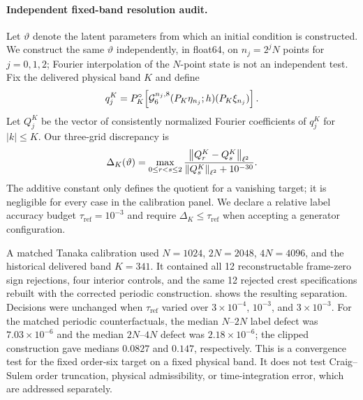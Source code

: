 \paragraph{Independent fixed-band resolution audit.}
Let $\vartheta$ denote the latent parameters from which an initial condition is
constructed.  We construct the same $\vartheta$ independently, in float64, on
$n_j=2^j N$ points for $j=0,1,2$; Fourier interpolation of the $N$-point state is
not an independent test.  Fix the delivered physical band $K$ and define
\begin{equation}
  q_j^K=P_K^\circ\!\left[
    \mathcal{G}_{6}^{n_j,8}(P_K\eta_{n_j};h)(P_K\xi_{n_j})
  \right].
  \label{eq:fixed-band-label}
\end{equation}
Let $Q_j^K$ be the vector of consistently normalized Fourier coefficients of
$q_j^K$ for $|k|\leq K$.  Our three-grid discrepancy is
\begin{equation}
  \Delta_K(\vartheta)
  =\max_{0\leq r<s\leq2}
  \frac{\left\lVert Q_r^K-Q_s^K\right\rVert_{\ell^2}}
       {\left\lVert Q_s^K\right\rVert_{\ell^2}+10^{-30}}.
  \label{eq:three-grid-discrepancy}
\end{equation}
The additive constant only defines the quotient for a vanishing target; it is
negligible for every case in the calibration panel.  We declare a relative
label accuracy budget $\tau_{\mathrm{ref}}=10^{-3}$ and require
$\Delta_K\leq\tau_{\mathrm{ref}}$ when accepting a generator configuration.

A matched Tanaka calibration used $N=1024$, $2N=2048$, $4N=4096$, and the
historical delivered band $K=341$.  It contained all 12 reconstructable
frame-zero sign rejections, four interior controls, and the same 12 rejected
crest specifications rebuilt with the corrected periodic construction.
 shows the resulting separation.  Decisions
were unchanged when
$\tau_{\mathrm{ref}}$ varied over
$3\times10^{-4}$, $10^{-3}$, and $3\times10^{-3}$.  For the matched periodic
counterfactuals, the median $N$--$2N$ label defect was
$7.03\times10^{-6}$ and the median $2N$--$4N$ defect was
$2.18\times10^{-6}$; the clipped construction gave medians $0.0827$ and
$0.147$, respectively.  This is a convergence test for the fixed order-six
target on a fixed physical band.  It does not test Craig--Sulem order
truncation, physical admissibility, or time-integration error, which are
addressed separately.

